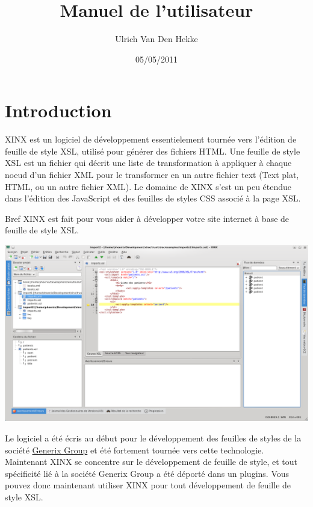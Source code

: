 \documentclass[a4paper,10pt,twoside]{book}
\author{Ulrich Van Den Hekke}
\date{05/05/2011}
\title{Manuel de l'utilisateur}
\begin{document}
  
\maketitle

\tableofcontents {}

\chapter{Introduction}

XINX est un logiciel de développement essentielement tournée vers l'édition de feuille de style XSL, utilisé pour générer des fichiers HTML. 
Une feuille de style XSL est un fichier qui décrit une liste de transformation à appliquer à chaque noeud d'un fichier XML pour le transformer en un autre fichier text (Text plat, HTML, ou un autre fichier XML). Le domaine de XINX s'est un peu étendue dans l'édition des JavaScript et des feuilles de styles CSS associé à la page XSL.

Bref XINX est fait pour vous aider à développer votre site internet à base de feuille de style XSL.

\begin{center}
 \includegraphics[width=\textwidth]{./mainform.png}
\end{center}

Le logiciel a été écris au début pour le développement des feuilles de styles de la société \href{http://www.generixgroup.com/}{Generix Group} et été fortement tournée vers cette technologie. Maintenant XINX se concentre sur le développement de feuille de style, et tout spécificité lié à la société Generix Group a été déporté dans un plugins. Vous pouvez donc maintenant utiliser XINX pour tout développement de feuille de style XSL.
\end{document}
